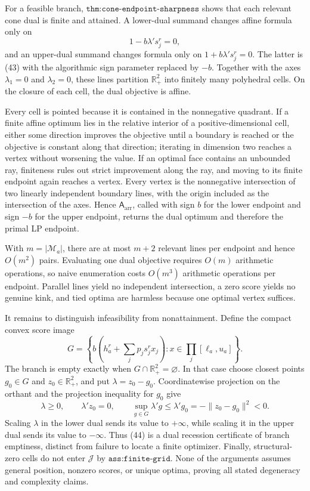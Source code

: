 For a feasible branch, \(\texttt{thm:cone-endpoint-sharpness}\) shows that each relevant cone dual is finite and attained.  A lower-dual summand changes affine formula only on
\[
 1-b\lambda's_j^r=0,                                                          \tag{43}
\]
and an upper-dual summand changes formula only on \(1+b\lambda's_j^r=0\).  The latter is (43) with the algorithmic sign parameter replaced by \(-b\).  Together with the axes \(\lambda_1=0\) and \(\lambda_2=0\), these lines partition \(\mathbb R_+^2\) into finitely many polyhedral cells.  On the closure of each cell, the dual objective is affine.

Every cell is pointed because it is contained in the nonnegative quadrant.  If a finite affine optimum lies in the relative interior of a positive-dimensional cell, either some direction improves the objective until a boundary is reached or the objective is constant along that direction; iterating in dimension two reaches a vertex without worsening the value.  If an optimal face contains an unbounded ray, finiteness rules out strict improvement along the ray, and moving to its finite endpoint again reaches a vertex.  Every vertex is the nonnegative intersection of two linearly independent boundary lines, with the origin included as the intersection of the axes.  Hence \(\mathsf A_{\mathrm{arr}}\), called with sign \(b\) for the lower endpoint and sign \(-b\) for the upper endpoint, returns the dual optimum and therefore the primal LP endpoint.

With \(m=|\mathcal M_a|\), there are at most \(m+2\) relevant lines per endpoint and hence \(O(m^2)\) pairs.  Evaluating one dual objective requires \(O(m)\) arithmetic operations, so naive enumeration costs \(O(m^3)\) arithmetic operations per endpoint.  Parallel lines yield no independent intersection, a zero score yields no genuine kink, and tied optima are harmless because one optimal vertex suffices.

It remains to distinguish infeasibility from nonattainment.  Define the compact convex score image
\[
 G=\left\{b\left(h_a^r+\sum_jp_js_j^rx_j\right):
 x\in\prod_j[\ell_a,u_a]\right\}.
\]
The branch is empty exactly when \(G\cap\mathbb R_+^2=\varnothing\).  In that case choose closest points \(g_0\in G\) and \(z_0\in\mathbb R_+^2\), and put \(\lambda=z_0-g_0\).  Coordinatewise projection on the orthant and the projection inequality for \(g_0\) give
\[
 \lambda\ge0,\qquad \lambda'z_0=0,\qquad
 \sup_{g\in G}\lambda'g
 \le\lambda'g_0=-\|z_0-g_0\|^2<0.                                           \tag{44}
\]
Scaling \(\lambda\) in the lower dual sends its value to \(+\infty\), while scaling it in the upper dual sends its value to \(-\infty\).  Thus (44) is a dual recession certificate of branch emptiness, distinct from failure to locate a finite optimizer.  Finally, structural-zero cells do not enter \(\mathcal J\) by \(\texttt{ass:finite-grid}\).  None of the arguments assumes general position, nonzero scores, or unique optima, proving all stated degeneracy and complexity claims.

